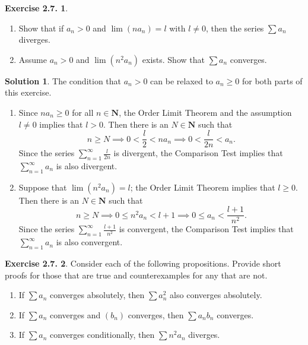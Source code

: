 \documentclass[12pt]{article}
\theoremstyle{definition}
\theoremstyle{exercise}
\newtheorem{exercise}{Exercise 2.7.}
\theoremstyle{solution}
\newtheorem*{solution}{Solution}
\newcommand{\N}{\mathbf{N}}
\begin{document}
\begin{exercise}
\label{ex:7}
    \begin{enumerate}
        \item Show that if \( a_n > 0 \) and \( \lim (n a_n) = l \) with \( l \neq 0 \), then the series \( \sum a_n \) diverges.

        \item Assume \( a_n > 0 \) and \( \lim (n^2 a_n) \) exists. Show that \( \sum a_n \) converges.
    \end{enumerate}
\end{exercise}

\begin{solution}
    The condition that \( a_n > 0 \) can be relaxed to \( a_n \geq 0 \) for both parts of this exercise.
    \begin{enumerate}
        \item Since \( n a_n \geq 0 \) for all \( n \in \N \), the Order Limit Theorem and the assumption \( l \neq 0 \) implies that \( l > 0 \). Then there is an \( N \in \N \) such that
        \[
            n \geq N \implies 0 < \frac{l}{2} < n a_n \implies 0 < \frac{l}{2 n} < a_n.
        \]
        Since the series \( \sum_{n=1}^{\infty} \tfrac{l}{2n} \) is divergent, the Comparison Test implies that \( \sum_{n=1}^{\infty} a_n \) is also divergent.

        \item Suppose that \( \lim (n^2 a_n) = l \); the Order Limit Theorem implies that \( l \geq 0 \). Then there is an \( N \in \N \) such that
        \[
            n \geq N \implies 0 \leq n^2 a_n < l + 1 \implies 0 \leq a_n < \frac{l + 1}{n^2}.
        \]
        Since the series \( \sum_{n=1}^{\infty} \tfrac{l + 1}{n^2} \) is convergent, the Comparison Test implies that \( \sum_{n=1}^{\infty} a_n \) is also convergent.
    \end{enumerate}
\end{solution}

\begin{exercise}
\label{ex:8}
    Consider each of the following propositions. Provide short proofs for those that are true and counterexamples for any that are not.
    \begin{enumerate}
        \item If \( \sum a_n \) converges absolutely, then \( \sum a_n^2 \) also converges absolutely.

        \item If \( \sum a_n \) converges and \( (b_n) \) converges, then \( \sum a_n b_n \) converges.

        \item If \( \sum a_n \) converges conditionally, then \( \sum n^2 a_n \) diverges.
    \end{enumerate}
\end{exercise}
\end{document}
